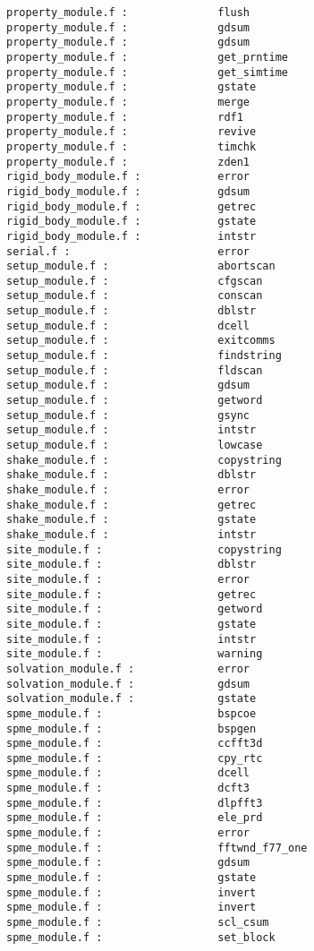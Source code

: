 \begin{verbatim}
property_module.f :              flush 
property_module.f :              gdsum 
property_module.f :              gdsum 
property_module.f :              get_prntime 
property_module.f :              get_simtime 
property_module.f :              gstate 
property_module.f :              merge 
property_module.f :              rdf1 
property_module.f :              revive 
property_module.f :              timchk 
property_module.f :              zden1 
rigid_body_module.f :            error 
rigid_body_module.f :            gdsum 
rigid_body_module.f :            getrec 
rigid_body_module.f :            gstate 
rigid_body_module.f :            intstr
serial.f :                       error 
setup_module.f :                 abortscan 
setup_module.f :                 cfgscan 
setup_module.f :                 conscan 
setup_module.f :                 dblstr
setup_module.f :                 dcell 
setup_module.f :                 exitcomms 
setup_module.f :                 findstring
setup_module.f :                 fldscan 
setup_module.f :                 gdsum 
setup_module.f :                 getword 
setup_module.f :                 gsync 
setup_module.f :                 intstr
setup_module.f :                 lowcase 
shake_module.f :                 copystring 
shake_module.f :                 dblstr
shake_module.f :                 error 
shake_module.f :                 getrec 
shake_module.f :                 gstate 
shake_module.f :                 intstr
site_module.f :                  copystring 
site_module.f :                  dblstr
site_module.f :                  error 
site_module.f :                  getrec 
site_module.f :                  getword 
site_module.f :                  gstate 
site_module.f :                  intstr
site_module.f :                  warning 
solvation_module.f :             error 
solvation_module.f :             gdsum 
solvation_module.f :             gstate 
spme_module.f :                  bspcoe 
spme_module.f :                  bspgen 
spme_module.f :                  ccfft3d 
spme_module.f :                  cpy_rtc 
spme_module.f :                  dcell 
spme_module.f :                  dcft3 
spme_module.f :                  dlpfft3 
spme_module.f :                  ele_prd 
spme_module.f :                  error 
spme_module.f :                  fftwnd_f77_one 
spme_module.f :                  gdsum 
spme_module.f :                  gstate 
spme_module.f :                  invert 
spme_module.f :                  invert 
spme_module.f :                  scl_csum 
spme_module.f :                  set_block 

\end{verbatim}
